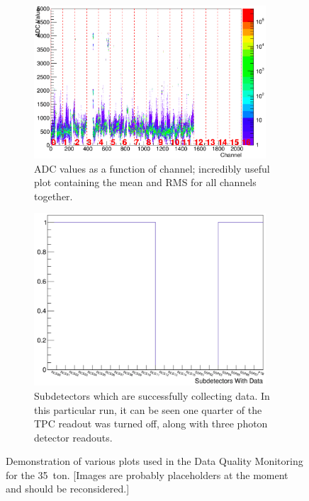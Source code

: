 \begin{figure}[p]
\begin{subfigure}[t]{0.48\linewidth}
    \centering
    \includegraphics[width=0.95\textwidth]{DQM3.png}
    \caption{ADC values as a function of channel; incredibly useful plot containing the mean and RMS for all channels together.}
    \label{fig:DQMPlot3}
  \end{subfigure}
  \begin{subfigure}[t]{0.48\linewidth}
    \centering
    \includegraphics[width=0.95\textwidth]{DQM4.png}
    \caption{Subdetectors which are successfully collecting data.  In this particular run, it can be seen one quarter of the TPC readout was turned off, along with three photon detector readouts.}
    \label{fig:DQMPlot4}
  \end{subfigure}
  \caption[Selection of Data Quality Monitoring figures]{Demonstration of various plots used in the Data Quality Monitoring for the 35~ton. [Images are probably placeholders at the moment and should be reconsidered.]}
  \label{fig:DQMPlots}
\end{figure}

